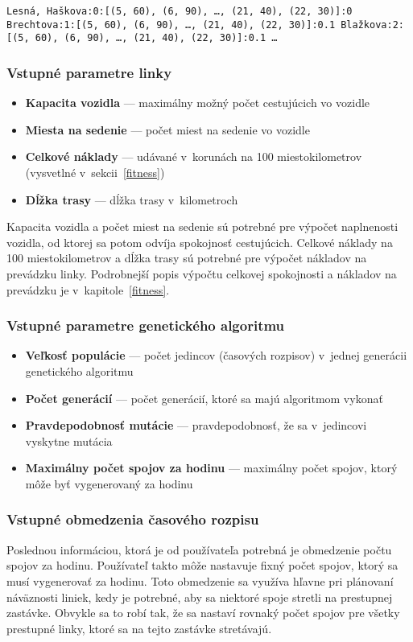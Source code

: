 \noindent \texttt{Lesná, Haškova:0:[(5, 60), (6, 90), \ldots , (21, 40), (22, 30)]:0 \newline
  Brechtova:1:[(5, 60), (6, 90), \ldots , (21, 40), (22, 30)]:0.1 \newline
  Blažkova:2:[(5, 60), (6, 90), \ldots , (21, 40), (22, 30)]:0.1 \newline
  \ldots
}

\subsubsection{Vstupné parametre linky}
\begin{itemize}
  \item \textbf{Kapacita vozidla} --- maximálny možný počet cestujúcich vo vozidle
  \item \textbf{Miesta na sedenie} --- počet miest na sedenie vo vozidle
  \item \textbf{Celkové náklady} --- udávané v~korunách na 100 miestokilometrov (vysvetlné v~sekcii~\ref{fitness})  
  \item \textbf{Dĺžka trasy} --- dĺžka trasy v~kilometroch
\end{itemize}
Kapacita vozidla a počet miest na sedenie sú potrebné pre výpočet naplnenosti vozidla, od ktorej sa potom odvíja spokojnosť cestujúcich.
Celkové náklady na 100 miestokilometrov a dĺžka trasy sú potrebné pre výpočet nákladov na prevádzku linky.
Podrobnejší popis výpočtu celkovej spokojnosti a nákladov na prevádzku je v~kapitole~\ref{fitness}.

\subsubsection{Vstupné parametre genetického algoritmu}
\begin{itemize}
  \item \textbf{Veľkosť populácie} --- počet jedincov (časových rozpisov) v~jednej generácii genetického algoritmu
  \item \textbf{Počet generácií} --- počet generácií, ktoré sa majú algoritmom vykonať
  \item \textbf{Pravdepodobnosť mutácie} --- pravdepodobnosť, že sa v~jedincovi vyskytne mutácia
  \item \textbf{Maximálny počet spojov za hodinu} --- maximálny počet spojov, ktorý môže byť vygenerovaný za hodinu
\end{itemize}

\subsubsection{Vstupné obmedzenia časového rozpisu}
Poslednou informáciou, ktorá je od používateľa potrebná je obmedzenie počtu spojov za hodinu.
Používateľ takto môže nastavuje fixný počet spojov, ktorý sa musí vygenerovať za hodinu.
Toto obmedzenie sa využíva hľavne pri plánovaní náväznosti liniek, kedy je potrebné, aby sa niektoré spoje stretli na prestupnej zastávke.
Obvykle sa to robí tak, že sa nastaví rovnaký počet spojov pre všetky prestupné linky, ktoré sa na tejto zastávke stretávajú.

